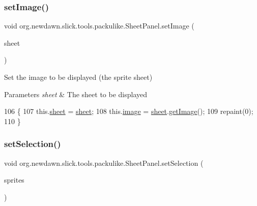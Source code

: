 \subsubsection{\texorpdfstring{set\+Image()}{setImage()}}
{\footnotesize\ttfamily void org.\+newdawn.\+slick.\+tools.\+packulike.\+Sheet\+Panel.\+set\+Image (\begin{DoxyParamCaption}\item[{\mbox{\hyperlink{classorg_1_1newdawn_1_1slick_1_1tools_1_1packulike_1_1_sheet}{Sheet}}}]{sheet }\end{DoxyParamCaption})\hspace{0.3cm}{\ttfamily [inline]}}

Set the image to be displayed (the sprite sheet)


\begin{DoxyParams}{Parameters}
{\em sheet} & The sheet to be displayed \\
\hline
\end{DoxyParams}

\begin{DoxyCode}
106                                       \{
107         this.\mbox{\hyperlink{classorg_1_1newdawn_1_1slick_1_1tools_1_1packulike_1_1_sheet_panel_a0b2d5c2c29f98d3da15ad5be1e666286}{sheet}} = \mbox{\hyperlink{classorg_1_1newdawn_1_1slick_1_1tools_1_1packulike_1_1_sheet_panel_a0b2d5c2c29f98d3da15ad5be1e666286}{sheet}};
108         this.\mbox{\hyperlink{classorg_1_1newdawn_1_1slick_1_1tools_1_1packulike_1_1_sheet_panel_a5f4ba74e6f8b8077e7f0797d45d57c8c}{image}} = \mbox{\hyperlink{classorg_1_1newdawn_1_1slick_1_1tools_1_1packulike_1_1_sheet_panel_a0b2d5c2c29f98d3da15ad5be1e666286}{sheet}}.\mbox{\hyperlink{classorg_1_1newdawn_1_1slick_1_1tools_1_1packulike_1_1_sheet_a343cacb8c7c31ae63b618d6e1d42fffb}{getImage}}();
109         repaint(0);
110     \}
\end{DoxyCode}
\mbox{\label{classorg_1_1newdawn_1_1slick_1_1tools_1_1packulike_1_1_sheet_panel_a059d3b0d4b88b10f3198da5a4b8394e4}} 
\subsubsection{\texorpdfstring{set\+Selection()}{setSelection()}}
{\footnotesize\ttfamily void org.\+newdawn.\+slick.\+tools.\+packulike.\+Sheet\+Panel.\+set\+Selection (\begin{DoxyParamCaption}\item[{Array\+List}]{sprites }\end{DoxyParamCaption})\hspace{0.3cm}{\ttfamily [inline]}}

